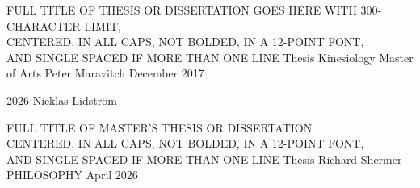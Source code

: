 
\thesistitlepage
    {FULL TITLE OF THESIS OR DISSERTATION GOES HERE WITH 300-CHARACTER LIMIT,\\
     CENTERED, IN ALL CAPS, NOT BOLDED, IN A 12-POINT FONT,\\
     AND SINGLE SPACED IF MORE THAN ONE LINE}
    {Thesis}                 %
    {Kinesiology}            %
    {Master of Arts}         %
    {Peter Maravitch}        %
    {December 2017}          %

\copyrightpage
    {2026}                   %
    {Nicklas Lidstr\"om}     %

\signaturepage
    {FULL TITLE OF MASTER'S THESIS OR DISSERTATION\\
     CENTERED, IN ALL CAPS, NOT BOLDED, IN A 12-POINT FONT,\\
     AND SINGLE SPACED IF MORE THAN ONE LINE}
    {Thesis}                 %
    {Richard Shermer}        %
    {PHILOSOPHY}             %
    {April 2026}            %
    {%
    }

